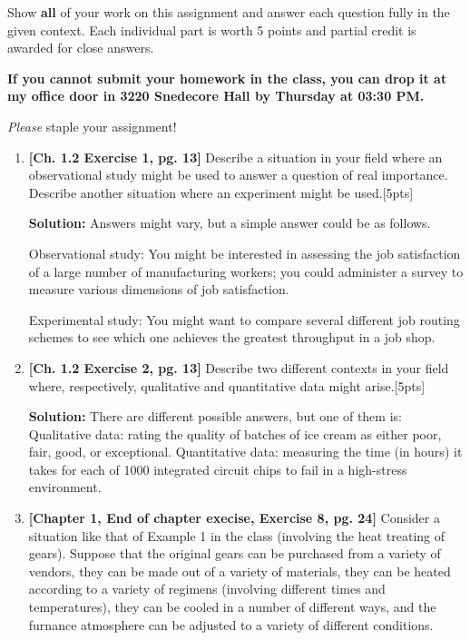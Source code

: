\documentclass[11pt]{article}\usepackage[]{graphicx}\usepackage[]{color}
\begin{document}
\pagestyle{fancy} 

Show \textbf{all} of your work on this assignment and answer each question fully in the given context. 
Each individual part is worth 5 points and partial credit is awarded for close answers.
\vspace{0.3cm}

\textbf{If you cannot submit your homework in the class, you can drop it at my office door in 3220 Snedecore Hall by Thursday at 03:30 PM.}

\vspace{0.3cm}
\emph{Please} staple your assignment!

\begin{enumerate}

\item \textbf{[Ch. 1.2 Exercise 1, pg. 13]} Describe a situation in your field where an observational study might be used to answer a question of real importance. Describe another situation where an experiment might be used.[5pts]

\textbf{Solution:} Answers might vary, but a simple answer could be as follows.

Observational study: You might be interested in assessing the job satisfaction of a large number of manufacturing workers; you could administer a survey to measure various dimensions of job satisfaction. 

Experimental study: You might want to compare several different job routing schemes to see which  one achieves the greatest throughput in a job shop. 

\item \textbf{[Ch. 1.2 Exercise 2, pg. 13]} Describe two different contexts in your field where, respectively, qualitative and quantitative data might arise.[5pts]

\textbf{Solution:} There are different possible answers, but one of them is:
Qualitative data: rating the quality of batches of ice cream as either poor, fair, good, or exceptional.
Quantitative data: measuring the time (in hours) it takes for each of 1000 integrated circuit chips to fail in a high-stress environment.


\item \textbf{[Chapter 1, End of chapter execise, Exercise 8, pg. 24]} Consider a situation like that of Example 1 in the class (involving the heat treating of gears). Suppose that the original gears can be purchased from a variety of vendors, they can be made out of a variety of materials, they can be heated according to a variety of regimens (involving different times and temperatures), they can be cooled in a number of different ways, and the furnance atmosphere can be adjusted to a variety of different conditions. 


\end{enumerate}
\end{document}
